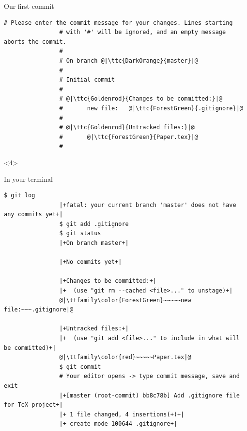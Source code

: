 \documentclass[usenames,svgnames,14pt]{beamer}
\newcommand{\ttc}[2]{\texttt{\textcolor{#1}{#2}}}
\begin{document}
\begin{frame}[fragile]{Our first commit}
\begin{overlayarea}{\textwidth}{0.7\textheight}
\begin{onlyenv}
\begin{lstlisting}[style=MyBash, aboveskip=2mm, xleftmargin=-3mm, xrightmargin=-3mm]
                # Please enter the commit message for your changes. Lines starting
                # with '#' will be ignored, and an empty message aborts the commit.
                #
                # On branch @|\ttc{DarkOrange}{master}|@
                #
                # Initial commit
                #
                # @|\ttc{Goldenrod}{Changes to be committed:}|@
                #       new file:   @|\ttc{ForestGreen}{.gitignore}|@
                #
                # @|\ttc{Goldenrod}{Untracked files:}|@
                #       @|\ttc{ForestGreen}{Paper.tex}|@
                #
            \end{lstlisting}
        \end{onlyenv}
        \begin{onlyenv}<4>
            \centerline{In your terminal}
            \begin{lstlisting}[style=MyBash, aboveskip=2mm, xleftmargin=-2mm, xrightmargin=-2mm]
                $ git log
                |+fatal: your current branch 'master' does not have any commits yet+|
                $ git add .gitignore
                $ git status
                |+On branch master+|
        
                |+No commits yet+|
        
                |+Changes to be committed:+|
                |+  (use "git rm --cached <file>..." to unstage)+|
                @|\ttfamily\color{ForestGreen}~~~~~new file:~~~.gitignore|@
        
                |+Untracked files:+|
                |+  (use "git add <file>..." to include in what will be committed)+|
                @|\ttfamily\color{red}~~~~~Paper.tex|@
                $ git commit
                # Your editor opens -> type commit message, save and exit
                |+[master (root-commit) bb8c78b] Add .gitignore file for TeX project+|
                |+ 1 file changed, 4 insertions(+)+|
                |+ create mode 100644 .gitignore+|
            \end{lstlisting}
        \end{onlyenv}
    \end{overlayarea}
\end{frame}
\end{document}
